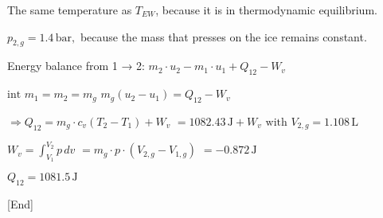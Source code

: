 The same temperature as \( T_{EW} \), because it is in thermodynamic equilibrium.  

\( p_{2,g} = 1.4 \, \text{bar}, \) because the mass that presses on the ice remains constant.  

Energy balance from 1 → 2:  
\( m_2 \cdot u_2 - m_1 \cdot u_1 + Q_{12} - W_v \)  

\( \text{int } m_1 = m_2 = m_g \)  
\( m_g (u_2 - u_1) = Q_{12} - W_v \)  

\( \Rightarrow Q_{12} = m_g \cdot c_v (T_2 - T_1) + W_v \)  
\( = 1082.43 \, \text{J} + W_v \text{ with } V_{2,g} = 1.108 \, \text{L} \)  

\( W_v = \int_{V_1}^{V_2} p \, dv \)  
\( = m_g \cdot p \cdot (V_{2,g} - V_{1,g}) \)  
\( = -0.872 \, \text{J} \)  

\( Q_{12} = 1081.5 \, \text{J} \)  

[End]
